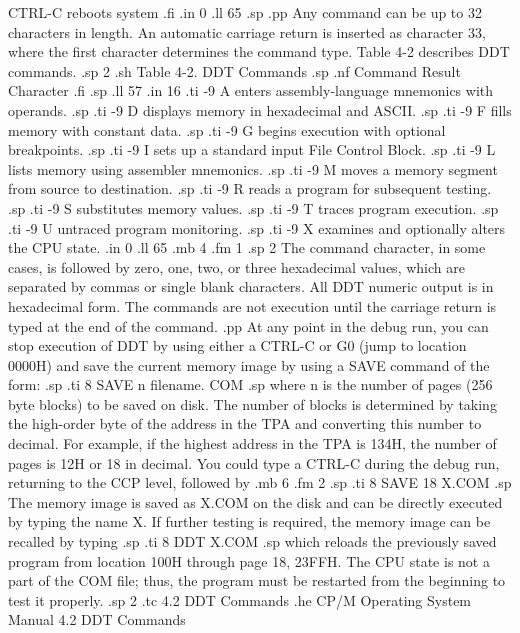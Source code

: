 CTRL-C      reboots system
.fi
.in 0
.ll 65
.sp
.pp
Any command can be up to 32 characters in length.  An automatic 
carriage return is inserted as character 33, where the 
first character determines the command type.  Table 4-2 describes DDT
commands.
.sp 2
.sh
                    Table 4-2.  DDT Commands
.sp
.nf
    Command                    Result
   Character
.fi
.sp
.ll 57
.in 16
.ti -9
A        enters assembly-language mnemonics with operands.
.sp
.ti -9
D        displays memory in hexadecimal and ASCII.
.sp
.ti -9
F        fills memory with constant data.
.sp
.ti -9
G        begins execution with optional breakpoints.
.sp
.ti -9
I        sets up a standard input File Control Block.
.sp
.ti -9
L        lists memory using assembler mnemonics.
.sp
.ti -9
M        moves a memory segment from source to destination.
.sp
.ti -9
R        reads a program for subsequent testing.
.sp
.ti -9
S        substitutes memory values.
.sp
.ti -9
T        traces program execution.
.sp
.ti -9
U        untraced program monitoring.
.sp
.ti -9
X        examines and optionally alters the CPU state.
.in 0
.ll 65
.mb 4
.fm 1
.sp 2
The command character, in some cases, is followed by zero, one, 
two, or three hexadecimal values, which are separated by commas 
or single blank characters.  All DDT numeric output is in 
hexadecimal form.  The commands are not execution until the 
carriage return is typed at the end of the command.
.pp
At any point in the debug run, you can stop execution of 
DDT by using either a CTRL-C or G0 (jump to location 0000H) and 
save the current memory image by using a SAVE command of the form:
.sp
.ti 8
SAVE n filename. COM
.sp
where n is the number of pages (256 byte blocks) to be saved on 
disk.  The number of blocks is determined by taking the high-order
byte of the address in the TPA and converting this number to 
decimal.  For example, if the highest address in the TPA is 134H, 
the number of pages is 12H or 18 in decimal.  You could type a 
CTRL-C during the debug run, returning to the CCP level, followed 
by
.mb 6
.fm 2
.sp
.ti 8
SAVE 18 X.COM
.sp
The memory image is saved as X.COM on the disk and can be 
directly executed by typing the name X.  If further testing is 
required, the memory image can be recalled by typing
.sp
.ti 8
DDT X.COM
.sp
which reloads the previously saved program from location 100H 
through page 18, 23FFH.  The CPU state is not a part of the COM 
file; thus, the program must be restarted from the beginning to 
test it properly.
.sp 2
.tc    4.2  DDT Commands
.he CP/M Operating System Manual                    4.2  DDT Commands
